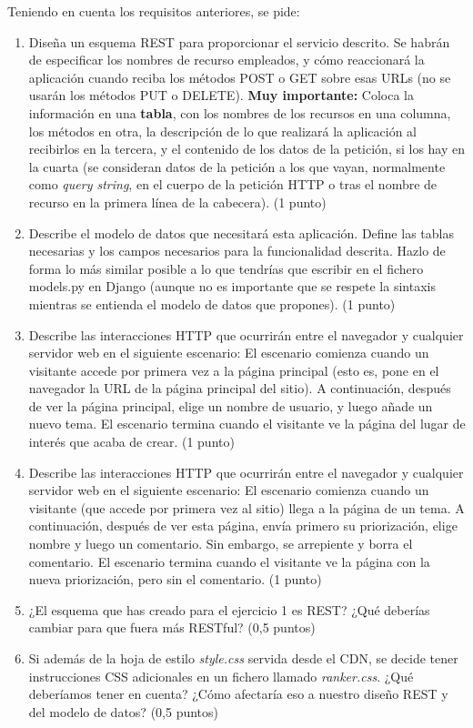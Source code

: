 Teniendo en cuenta los requisitos anteriores, se pide:

\begin{enumerate}
    \item Diseña un esquema REST para proporcionar el servicio descrito. Se habrán de especificar los nombres de recurso empleados, y cómo reaccionará la aplicación cuando reciba los métodos POST o GET sobre esas URLs (no se usarán los métodos PUT o DELETE). \textbf{Muy importante:} Coloca la información en una \textbf{tabla}, con los nombres de los recursos en una columna, los métodos en otra, la descripción de lo que realizará la aplicación al recibirlos en la tercera, y el contenido de los datos de la petición, si los hay en la cuarta (se consideran datos de la petición a los que vayan, normalmente como \emph{query string}, en el cuerpo de la petición HTTP o tras el nombre de recurso en la primera línea de la cabecera). (1 punto)

    \item Describe el modelo de datos que necesitará esta aplicación. Define las tablas necesarias y los campos necesarios para la funcionalidad descrita. Hazlo de forma lo más similar posible a lo que tendrías que escribir en el fichero models.py en Django (aunque no es importante que se respete la sintaxis mientras se entienda el modelo de datos que propones). (1 punto)

    \item Describe las interacciones HTTP que ocurrirán entre el navegador y cualquier servidor web en el siguiente escenario: El escenario comienza cuando un visitante accede por primera vez a la página principal (esto es, pone en el navegador la URL de la página principal del sitio). A continuación, después de ver la página principal, elige un nombre de usuario, y luego añade un nuevo tema. El escenario termina cuando el visitante ve la página del lugar de interés que acaba de crear. (1 punto)

    \item Describe las interacciones HTTP que ocurrirán entre el navegador y cualquier servidor web en el siguiente escenario: El escenario comienza cuando un visitante (que accede por primera vez al sitio) llega a la página de un tema. A continuación, después de ver esta página, envía primero su priorización, elige nombre y luego un comentario. Sin embargo, se arrepiente y borra el comentario. El escenario termina cuando el visitante ve la página con la nueva priorización, pero sin el comentario. (1 punto)

    \item  ¿El esquema que has creado para el ejercicio 1 es REST? ¿Qué deberías cambiar para que fuera más RESTful? (0,5 puntos)

    \item Si además de la hoja de estilo \emph{style.css} servida desde el CDN, se decide tener instrucciones CSS adicionales en un fichero llamado \emph{ranker.css}. ¿Qué deberíamos tener en cuenta? ¿Cómo afectaría eso a nuestro diseño REST y del modelo de datos? (0,5 puntos)

\end{enumerate}

